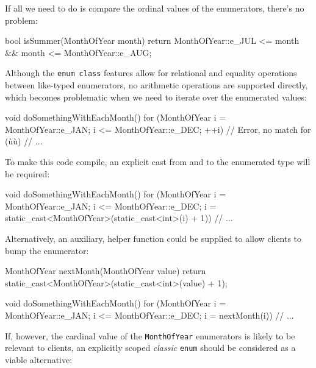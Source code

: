 \noindent If all we need to do is compare the ordinal values of the enumerators,
there's no problem:

\begin{emcppslisting}[emcppsbatch=e15]
bool isSummer(MonthOfYear month)
{
    return MonthOfYear::e_JUL <= month && month <= MonthOfYear::e_AUG;
}
\end{emcppslisting}

\noindent Although the \texttt{enum}~\texttt{class} features allow for relational
and equality operations between like-typed enumerators, no arithmetic
operations are supported directly, which becomes problematic when we
need to iterate over the enumerated values:

\begin{emcppslisting}[emcppsbatch=e15,emcppsignore={Entire for block is marked Error}]
void doSomethingWithEachMonth()
{
    for (MonthOfYear i =  MonthOfYear::e_JAN;
                     i <= MonthOfYear::e_DEC;
                   ++i)  // Error, no match for (ù{\codeincomments{++}}ù)
    {
        // ...
    }
}
\end{emcppslisting}

\noindent To make this code compile, an explicit cast from and to the enumerated
type will be required:

\begin{emcppslisting}[emcppsbatch=e15]
void doSomethingWithEachMonth()
{
    for (MonthOfYear i =  MonthOfYear::e_JAN;
                     i <= MonthOfYear::e_DEC;
                     i = static_cast<MonthOfYear>(static_cast<int>(i) + 1))
    {
        // ...
    }
}
\end{emcppslisting}

\noindent Alternatively, an auxiliary, helper function could be supplied to allow
clients to bump the enumerator:

\begin{emcppslisting}[emcppsbatch=e16]
MonthOfYear nextMonth(MonthOfYear value)
{
    return static_cast<MonthOfYear>(static_cast<int>(value) + 1);
}

void doSomethingWithEachMonth()
{
    for (MonthOfYear i =  MonthOfYear::e_JAN;
                     i <= MonthOfYear::e_DEC;
                     i = nextMonth(i))
    {
        // ...
    }
}
\end{emcppslisting}

\noindent If, however, the cardinal value of the \texttt{MonthOfYear} enumerators
is likely to be relevant to clients, an explicitly scoped \emph{classic}
\texttt{enum} should be considered as a viable alternative:

